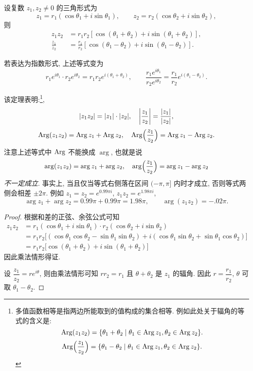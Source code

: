 \begin{theorem}
  设复数 $z_1,z_2\neq0$ 的三角形式为
  \[z_1=r_1(\cos\theta_1+i\sin\theta_1),\qquad
    z_2=r_2(\cos\theta_2+i\sin\theta_2),\]
  则
  \begin{align*}
    z_1z_2&=r_1r_2[\cos(\theta_1+\theta_2)+i\sin(\theta_1+\theta_2)],\\
    \frac{z_1}{z_2}&=\frac{r_1}{r_2}[\cos(\theta_1-\theta_2)+i\sin(\theta_1-\theta_2)].
  \end{align*}
\end{theorem}

若表达为指数形式, 上述等式变为
  \[
  r_1e^{i\theta_1}\cdot r_2e^{i\theta_2}=r_1r_2e^{i(\theta_1+\theta_2)},\qquad
  \frac{r_1e^{i\theta_1}}{r_2e^{i\theta_2}}=\frac{r_1}{r_2}e^{i(\theta_1-\theta_2)}.
  \]

该定理表明:\footnote{多值函数相等是指两边所能取到的值构成的集合相等.
例如此处关于辐角的等式的含义是:
  \[\operatorname{Arg}(z_1z_2)=\{\theta_1+\theta_2\mid\theta_1\in\operatorname{Arg} z_1,\theta_2\in\operatorname{Arg} z_2\}.\]
  \[\operatorname{Arg}\Bigl(\frac{z_1}{z_2}\Bigr)=\{\theta_1-\theta_2\mid\theta_1\in\operatorname{Arg} z_1,\theta_2\in\operatorname{Arg} z_2\}.\]
},
  \[|z_1z_2|=|z_1|\cdot|z_2|,\quad\left|\frac{z_1}{z_2}\right|=\frac{|z_1|}{|z_2|},\]
  \[\operatorname{Arg}(z_1z_2)=\operatorname{Arg} z_1+\operatorname{Arg} z_2,\quad
  \operatorname{Arg}\Bigl(\frac{z_1}{z_2}\Bigr)=\operatorname{Arg} z_1-\operatorname{Arg} z_2.\]
注意上述等式中 $\operatorname{Arg}$ 不能换成 $\arg$, 也就是说
  \[\arg(z_1z_2)=\arg z_1+\arg z_2,\quad
  \arg\Bigl(\frac{z_1}{z_2}\Bigr)=\arg z_1-\arg z_2\]
\emph{不一定成立}.
事实上, 当且仅当等式右侧落在区间 $(-\pi,\pi]$ 内时才成立, 否则等式两侧会相差 $\pm2\pi$.
例如 $z_1=z_2=e^{0.99\pi i}$, $z_1z_2=e^{1.98\pi i}$,
\[\arg z_1+\arg z_2=0.99\pi+0.99\pi=1.98\pi,\qquad
\arg(z_1z_2)=-.02\pi.\]

\begin{proof}
  根据和差的正弦、余弦公式可知
  \begin{align*}
    z_1z_2&=r_1(\cos\theta_1+i\sin\theta_1)\cdot
    r_2(\cos\theta_2+i\sin\theta_2)\\
    &{=r_1r_2\bigl[(\cos\theta_1\cos\theta_2-\sin\theta_1\sin\theta_2)
    +i(\cos\theta_1\sin\theta_2+\sin\theta_1\cos\theta_2)\bigr]}\\
    &{=r_1r_2\bigl[\cos(\theta_1+\theta_2)+i\sin(\theta_1+\theta_2)\bigr]}
  \end{align*}
  因此乘法情形得证.

  设 $\dfrac{z_1}{z_2}=re^{i\theta}$, 则由乘法情形可知 $rr_2=r_1$ 且 $\theta+\theta_2$ 是 $z_1$ 的辐角.
  因此 $r=\dfrac{r_1}{r_2}$, $\theta$ 可取 $\theta_1-\theta_2$.
\end{proof}


